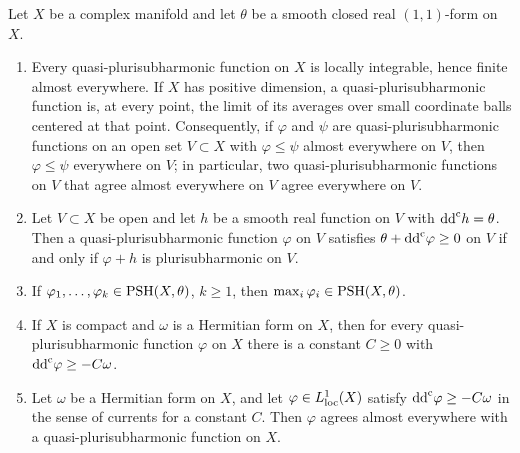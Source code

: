 \begin{lemma}\label{lem:quasi-psh-basic}
Let $X$ be a complex manifold and let $\theta$ be a smooth closed real $(1,1)$-form on $X$.
\begin{enumerate}
\item Every quasi-plurisubharmonic function on $X$ is locally integrable, hence finite almost everywhere. If $X$ has positive dimension, a quasi-plurisubharmonic function is, at every point, the limit of its averages over small coordinate balls centered at that point. Consequently, if $\varphi$ and $\psi$ are quasi-plurisubharmonic functions on an open set $V\subset X$ with $\varphi\leq\psi$ almost everywhere on $V$, then $\varphi\leq\psi$ everywhere on $V$; in particular, two quasi-plurisubharmonic functions on $V$ that agree almost everywhere on $V$ agree everywhere on $V$.
\item Let $V\subset X$ be open and let $h$ be a smooth real function on $V$ with $\mathrm{dd}^{\mathrm{c}} h=\theta$. Then a quasi-plurisubharmonic function $\varphi$ on $V$ satisfies $\theta+\mathrm{dd}^{\mathrm{c}}\varphi\geq0$ on $V$ if and only if $\varphi+h$ is plurisubharmonic on $V$.
\item If $\varphi_1,\ldots,\varphi_k\in\mathrm{PSH}(X,\theta)$, $k\geq1$, then $\max_i\varphi_i\in\mathrm{PSH}(X,\theta)$.
\item If $X$ is compact and $\omega$ is a Hermitian form on $X$, then for every quasi-plurisubharmonic function $\varphi$ on $X$ there is a constant $C\geq0$ with $\mathrm{dd}^{\mathrm{c}}\varphi\geq-C\omega$.
\item Let $\omega$ be a Hermitian form on $X$, and let $\varphi\in L^1_{\mathrm{loc}}(X)$ satisfy $\mathrm{dd}^{\mathrm{c}}\varphi\geq-C\omega$ in the sense of currents for a constant $C$. Then $\varphi$ agrees almost everywhere with a quasi-plurisubharmonic function on $X$.
\end{enumerate}
\end{lemma}
